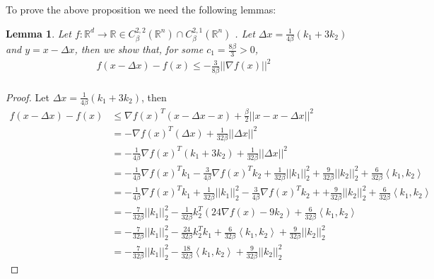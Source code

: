 \documentclass[12pt,twoside]{article}
\newtheorem{lemma}{Lemma}
\begin{document}
To prove the above proposition we need the following lemmas:
\begin{lemma}
Let $f : \mathbb{R}^d \rightarrow \mathbb{R} \in C_{\beta}^{2,2}( \mathbb{R}^n) \cap  C_{\beta}^{2,1}( \mathbb{R}^n) $  . Let $\Delta x =  \frac{1}{4\beta}(k_1 + 3k_2)$ and $ y  = x - \Delta x$, then  we show that, for some $c_1= \frac{8\beta}{3} >0 $,
\begin{align}
f(x - \Delta x ) - f(x) \leq - \frac{3}{8 \beta} || \nabla f(x) ||^2 \\
\end{align}
\end{lemma}
\begin{proof}
Let $\Delta x =  \frac{1}{4\beta}(k_1 + 3k_2)$, then
\begin{equation}
\begin{aligned}\label{ineq0}
f(x - \Delta x) - f(x) &\leq \nabla f(x)^T (x - \Delta x - x) + \frac{\beta}{2} || x - x - \Delta x ||^2 \\
&= -  \nabla f(x)^T ( \Delta x) + \frac{1}{32 \beta} || \Delta x ||^2 \\
&= -\frac{1}{4 \beta} \nabla  f(x)^T ( k_1 + 3k_2) + \frac{1}{32 \beta} || \Delta x ||^2 \\
&= -\frac{1}{4\beta}\nabla f(x)^T k_1 - \frac{3}{4\beta}\nabla f(x)^T k_2 + \frac{1}{32 \beta} || k_1 ||_2^2 + \frac{9}{32 \beta} || k_2 ||^2_2 + \frac{6}{32\beta}\left\langle k_1, k_2 \right\rangle \\
&= -\frac{1}{4\beta}\nabla f(x)^T k_1 +  \frac{1}{32 \beta} || k_1 ||_2^2 -  \frac{3}{4\beta}\nabla f(x)^T k_2 +  + \frac{9}{32 \beta} || k_2 ||^2_2  + \frac{6}{32\beta}\left\langle k_1, k_2 \right\rangle \\
&= -\frac{7}{32 \beta}|| k_1 ||_2^2 -\frac{1}{32 \beta}k_2^T(24 \nabla f(x) - 9 k_2) + \frac{6}{32\beta}\left\langle k_1, k_2 \right\rangle \\
&= -\frac{7}{32 \beta}|| k_1 ||_2^2 - \frac{24}{32 \beta}k_2^Tk_1 + \frac{6}{32 \beta}\left\langle k_1, k_2 \right\rangle + \frac{9}{32\beta}|| k_2 ||_2^2 \\
&= -\frac{7}{32 \beta}|| k_1 ||_2^2 - \frac{18}{32 \beta} \left\langle k_1, k_2 \right\rangle + \frac{9}{32 \beta}|| k_2 ||_2^2
\end{aligned}
\end{equation}


\end{proof}
\end{document}
